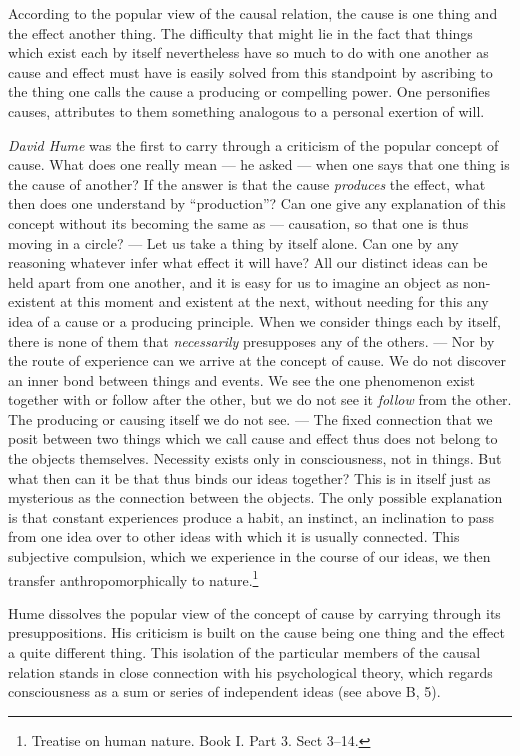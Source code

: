 \documentclass[12pt,a4paper]{book}
\newcommand{\opage}[1]{\marginnote{\footnotesize\textit{[#1]}}}
\begin{document}
According to the popular view of the causal relation, the cause is one
thing and the effect another thing. The difficulty that might lie in the
fact that things which exist each by itself nevertheless have so much to
do with one another as cause and effect must have is easily solved from
this standpoint by ascribing to the thing one calls the cause a
producing or compelling power. One personifies causes, attributes to
them something analogous to a personal exertion of will.

\emph{David Hume} was the first to carry through a criticism of the
popular concept of cause. What does one really mean --- he asked ---
when one says that one thing is the cause of another? If the answer is
that the cause \emph{produces} the effect, what then does one understand
by ``production''? Can one give any explanation of this concept without
its becoming the same as --- causation, so that one is thus moving in a
circle? --- Let us take a thing by itself alone. Can one by any
reasoning whatever infer what effect it will have? All our distinct ideas
can be held apart from one another, and it is easy for us to imagine an
object as non-existent at this moment and existent at the next, without
needing for this any idea of a cause or a producing principle. When we
consider things each by itself, there is none of them that
\emph{necessarily} presupposes any of the others. --- Nor by the route of
\opage{256}experience can we arrive at the concept of cause. We do not
discover an inner bond between things and events. We see the one
phenomenon exist together with or follow after the other, but we do not
see it \emph{follow} from the other. The producing or causing itself we
do not see. --- The fixed connection that we posit between two things
which we call cause and effect thus does not belong to the objects
themselves. Necessity exists only in consciousness, not in things. But
what then can it be that thus binds our ideas together? This is in
itself just as mysterious as the connection between the objects. The
only possible explanation is that constant experiences produce a habit,
an instinct, an inclination to pass from one idea over to other ideas
with which it is usually connected. This subjective compulsion, which we
experience in the course of our ideas, we then transfer
anthropomorphically to nature.\footnote{Treatise on human nature. Book
I. Part 3. Sect 3--14.}

Hume dissolves the popular view of the concept of cause by carrying
through its presuppositions. His criticism is built on the cause being
one thing and the effect a quite different thing. This isolation of the
particular members of the causal relation stands in close connection with
his psychological theory, which regards consciousness as a sum or series
of independent ideas (see above B, 5).
\end{document}
